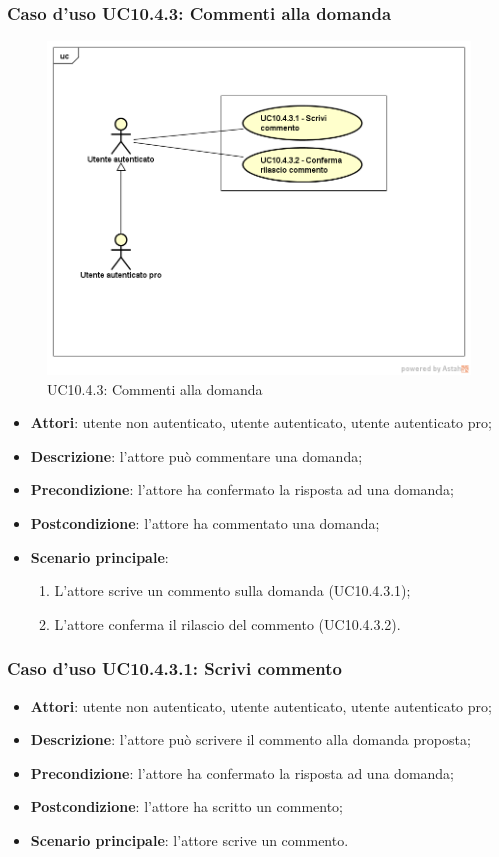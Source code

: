 \subsubsection{Caso d'uso UC10.4.3: Commenti alla domanda}
\label{UC10.4.3}
\begin{figure}
	\centering
	\includegraphics[scale=0.5]{UML/UC10_4_3.png}
	\caption{UC10.4.3: Commenti alla domanda}
\end{figure}
	\begin{itemize}
		\item \textbf{Attori}: utente non autenticato, utente autenticato, utente autenticato pro;
		\item \textbf{Descrizione}: l'attore può commentare una domanda;
		\item \textbf{Precondizione}: l'attore ha confermato la risposta ad una domanda;
		\item \textbf{Postcondizione}: l'attore ha commentato una domanda;
		\item \textbf{Scenario principale}:
			\begin{enumerate}
				\item L'attore scrive un commento sulla domanda (UC10.4.3.1);
				\item L'attore conferma il rilascio del commento (UC10.4.3.2).
			\end{enumerate}
	\end{itemize}
\subsubsection{Caso d'uso UC10.4.3.1: Scrivi commento}
	\begin{itemize}
		\item \textbf{Attori}: utente non autenticato, utente autenticato, utente autenticato pro;
		\item \textbf{Descrizione}: l'attore può scrivere il commento alla domanda proposta;
		\item \textbf{Precondizione}: l'attore ha confermato la risposta ad una domanda;
		\item \textbf{Postcondizione}: l'attore ha scritto un commento;
		\item \textbf{Scenario principale}: l'attore scrive un commento.
	\end{itemize}
